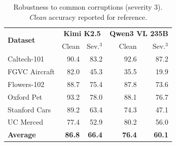 \begin{table}[t]
\centering
\setlength{\tabcolsep}{5pt}
\renewcommand{\arraystretch}{1.08}
\small
\caption{%
  Robustness to common corruptions (severity 3).
  \emph{Clean} accuracy reported for reference.
}
\label{tab:common_bedrock}
\begin{tabular}{l || r r || r r}
\toprule
\multirow{2}{*}{\textbf{Dataset}} & \multicolumn{2}{c||}{\textbf{Kimi K2.5}} & \multicolumn{2}{c}{\textbf{Qwen3 VL 235B}} \\
 & Clean & Sev.$^3$ & Clean & Sev.$^3$ \\
\midrule
Caltech-101 & 90.4 & 83.2 & 92.6 & 87.2 \\
FGVC Aircraft & 82.0 & 45.3 & 35.5 & 19.9 \\
Flowers-102 & 88.7 & 75.4 & 87.8 & 73.6 \\
Oxford Pet & 93.2 & 78.0 & 88.1 & 76.7 \\
Stanford Cars & 89.2 & 63.4 & 74.3 & 47.1 \\
UC Merced & 77.4 & 52.9 & 80.2 & 56.0 \\
\midrule
\textbf{Average} & \textbf{86.8} & \textbf{66.4} & \textbf{76.4} & \textbf{60.1} \\
\bottomrule
\end{tabular}
\end{table}